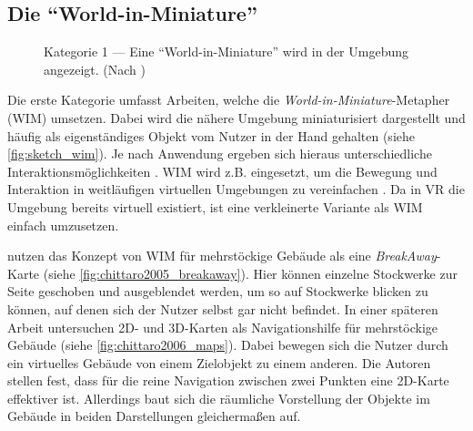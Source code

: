 \subsection{Die \enquote{World-in-Miniature}}
\begin{figure}[ht]
    \centering
    \caption{Kategorie 1 --- Eine \enquote{World-in-Miniature} wird in der Umgebung angezeigt. (Nach \textcite[265]{Stoakley1995})}
    \label{fig:sketch_wim}
\end{figure}

Die erste Kategorie umfasst Arbeiten, welche die \emph{World-in-Miniature}-Metapher (WIM) umsetzen.
Dabei wird die nähere Umgebung miniaturisiert dargestellt und häufig als eigenständiges Objekt vom Nutzer in der Hand gehalten (siehe \autoref{fig:sketch_wim}).
Je nach Anwendung ergeben sich hieraus unterschiedliche Interaktionsmöglichkeiten \parencite{Stoakley1995}.
WIM wird z.B. eingesetzt, um die Bewegung und Interaktion in weitläufigen virtuellen Umgebungen zu vereinfachen \parencites[vgl.]{Trueba2010}{Elvezio2017}.
Da in VR die Umgebung bereits virtuell existiert, ist eine verkleinerte Variante als WIM einfach umzusetzen.

\textcite{Chittaro2005} nutzen das Konzept von WIM für mehrstöckige Gebäude als eine \emph{BreakAway}-Karte (siehe \autoref{fig:chittaro2005_breakaway}).
Hier können einzelne Stockwerke zur Seite geschoben und ausgeblendet werden, um so auf Stockwerke blicken zu können, auf denen sich der Nutzer selbst gar nicht befindet.
In einer späteren Arbeit untersuchen \textcite{Chittaro2006} 2D- und 3D-Karten als Navigationshilfe für mehrstöckige Gebäude (siehe \autoref{fig:chittaro2006_maps}).
Dabei bewegen sich die Nutzer durch ein virtuelles Gebäude von einem Zielobjekt zu einem anderen.
Die Autoren stellen fest, dass für die reine Navigation zwischen zwei Punkten eine 2D-Karte effektiver ist.
Allerdings baut sich die räumliche Vorstellung der Objekte im Gebäude in beiden Darstellungen gleichermaßen auf.

